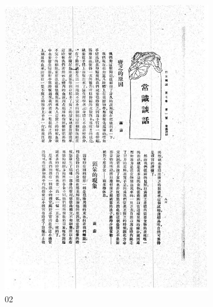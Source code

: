 \documentclass[12pt,twoside]{report}
\begin{document}
\begin{appendices}
\begin{figure}[htbp]
\begin{subfigure}[b]{0.23\linewidth}
        \includegraphics[width=\linewidth]{./figures/testset/02.jpg}
        \caption{02}
        \label{fig:test_02}
    \end{subfigure}
    \hfill
    \begin{subfigure}[b]{0.23\linewidth}

\end{subfigure}
\end{figure}
\end{appendices}
\end{document}
